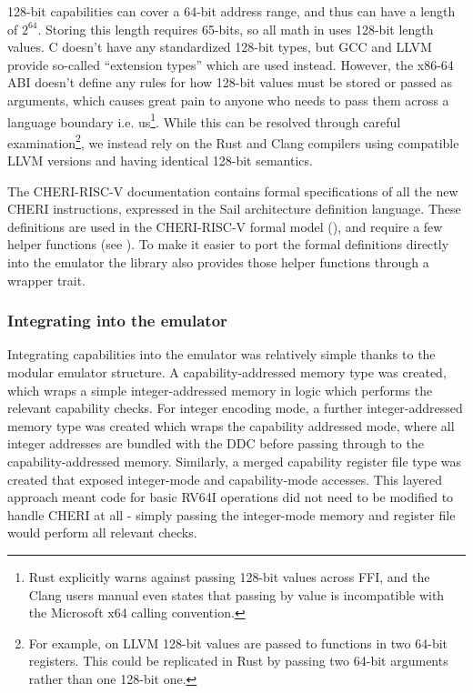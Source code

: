 128-bit capabilities can cover a 64-bit address range, and thus can have a length of $2^{64}$.
Storing this length requires 65-bits, so all math in  uses 128-bit length values.
C doesn't have any standardized 128-bit types, but GCC and LLVM provide so-called ``extension types'' which are used instead.
However, the x86-64 ABI doesn't define any rules for how 128-bit values must be stored or passed as arguments, which causes great pain to anyone who needs to pass them across a language boundary i.e. us\footnote{Rust explicitly warns against passing 128-bit values across FFI, and the Clang users manual even states that passing  by value is incompatible with the Microsoft x64 calling convention.}.
While this can be resolved through careful examination\footnote{For example, on LLVM 128-bit values are passed to functions in two 64-bit registers. This could be replicated in Rust by passing two 64-bit arguments rather than one 128-bit one.}, we instead rely on the Rust and Clang compilers using compatible LLVM versions and having identical 128-bit semantics.


The CHERI-RISC-V documentation contains formal specifications of all the new CHERI instructions, expressed in the Sail architecture definition  language.
These definitions are used in the CHERI-RISC-V formal model (), and require a few helper functions (see ).
To make it easier to port the formal definitions directly into the emulator the  library also provides those helper functions through a wrapper trait.


\subsubsection{Integrating into the emulator}
Integrating capabilities into the emulator was relatively simple thanks to the modular emulator structure.
A capability-addressed memory type was created, which wraps a simple integer-addressed memory in logic which performs the relevant capability checks.
For integer encoding mode, a further integer-addressed memory type was created which wraps the capability addressed mode, where all integer addresses are bundled with the DDC before passing through to the capability-addressed memory.
Similarly, a merged capability register file type was created that exposed integer-mode and capability-mode accesses.
This layered approach meant code for basic RV64I operations did not need to be modified to handle CHERI at all - simply passing the integer-mode memory and register file would perform all relevant checks.


